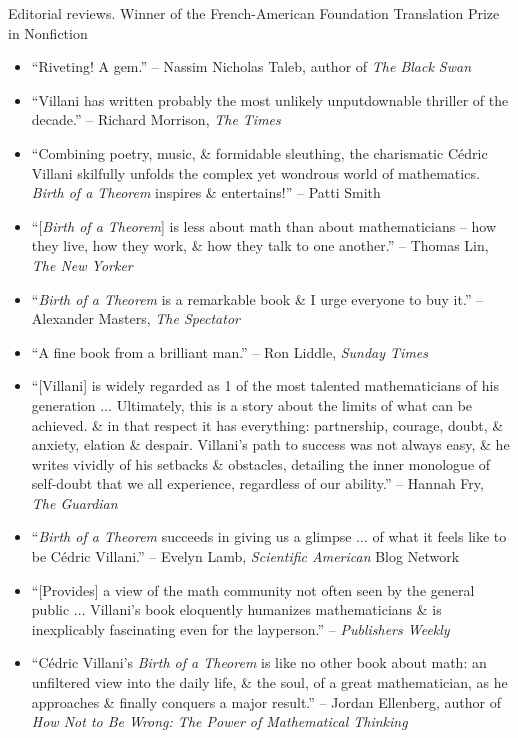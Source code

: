 \documentclass{article}
\begin{document}
\begin{enumerate}
	{\sf Editorial reviews.} Winner of the French-American Foundation Translation Prize in Nonfiction
	\begin{itemize}
		\item ``Riveting! A gem.'' -- {\sc Nassim Nicholas Taleb}, author of {\it The Black Swan}
		\item ``{\sc Villani} has written probably the most unlikely unputdownable thriller of the decade.'' -- {\sc Richard Morrison}, {\it The Times}
		\item ``Combining poetry, music, \& formidable sleuthing, the charismatic {\sc C\'edric Villani} skilfully unfolds the complex yet wondrous world of mathematics. {\it Birth of a Theorem} inspires \& entertains!'' -- {\sc Patti Smith}
		\item ``[{\it Birth of a Theorem}] is less about math than about mathematicians -- how they live, how they work, \& how they talk to one another.'' -- {\sc Thomas Lin}, {\it The New Yorker}
		\item ``{\it Birth of a Theorem} is a remarkable book \& I urge everyone to buy it.'' -- {\sc Alexander Masters}, {\it The Spectator}
		\item ``A fine book from a brilliant man.'' -- {\sc Ron Liddle}, {\it Sunday Times}
		\item ``[{\sc Villani}] is widely regarded as 1 of the most talented mathematicians of his generation $\ldots$ Ultimately, this is a story about the limits of what can be achieved. \& in that respect it has everything: partnership, courage, doubt, \& anxiety, elation \& despair. {\sc Villani}'s path to success was not always easy, \& he writes vividly of his setbacks \& obstacles, detailing the inner monologue of self-doubt that we all experience, regardless of our ability.'' -- {\sc Hannah Fry}, {\it The Guardian}
		\item ``{\it Birth of a Theorem} succeeds in giving us a glimpse $\ldots$ of what it feels like to be {\sc C\'edric Villani}.'' -- {\sc Evelyn Lamb}, {\it Scientific American} Blog Network
		\item ``[Provides] a view of the math community not often seen by the general public $\ldots$ {\sc Villani}'s book eloquently humanizes mathematicians \& is inexplicably fascinating even for the layperson.'' -- {\it Publishers Weekly}
		\item ``{\sc C\'edric Villani}'s {\it Birth of a Theorem} is like no other book about math: an unfiltered view into the daily life, \& the soul, of a great mathematician, as he approaches \& finally conquers a major result.'' -- {\sc Jordan Ellenberg}, author of {\it How Not to Be Wrong: The Power of Mathematical Thinking}

\end{itemize}
\end{enumerate}
\end{document}
